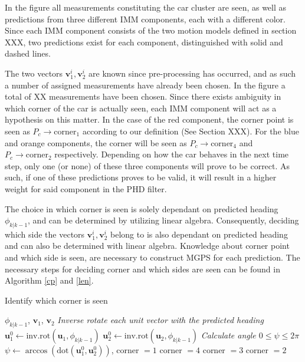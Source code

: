 In the figure all measurements constituting the car cluster are seen, as well as predictions from three different IMM components, each with a different color. Since each IMM component consists of the two motion models defined in section XXX, two predictions exist for each component, distinguished with solid and dashed lines. 

The two vectors $\mathbf{v}_{1}^i, \mathbf{v}_{2}^i$ are known since pre-processing has occurred, and as such a number of assigned measurements have already been chosen. In the figure a total of XX measurements have been chosen. Since there exists ambiguity in which corner of the car is actually seen, each IMM component will act as a hypothesis on this matter. In the case of the red component, the corner point is seen as $P_c \rightarrow \text{corner}_1$ according to our definition (See Section XXX). For the blue and orange components, the corner will be seen as $P_c \rightarrow \text{corner}_4$ and $P_c \rightarrow \text{corner}_2$ respectively. Depending on how the car behaves in the next time step, only one (or none) of these three components will prove to be correct. As such, if one of these predictions proves to be valid, it will result in a higher weight for said component in the PHD filter.

The choice in which corner is seen is solely dependant on predicted heading $\phi_{k|k-1}$, and can be determined by utilizing linear algebra. Consequently, deciding which side the vectors $\mathbf{v}_{1}^i, \mathbf{v}_{2}^i$ belong to is also dependant on predicted heading and can also be determined with linear algebra. Knowledge about corner point and which side is seen, are necessary to construct MGPS for each prediction. The necessary steps for deciding corner and which sides are seen can be found in Algorithm \ref{cp} and \ref{len}.


\begin{algorithm}[H]
\caption{Identify which corner is seen}\label{cp}
\begin{algorithmic}
\Input $\phi_{k|k-1}$, $\mathbf{v}_1$, $\mathbf{v}_2$
\State \textit{Inverse rotate each unit vector with the predicted heading}
\State $\mathbf{u}_1^{0}  \leftarrow \text{inv.rot}(\mathbf{u}_1, \phi_{k|k-1})$
\State $\mathbf{u}_2^{0}  \leftarrow \text{inv.rot}(\mathbf{u}_2, \phi_{k|k-1})$
\State \textit{Calculate angle $0 \leq \psi \leq 2\pi$}
\State $\psi \leftarrow \arccos(\text{dot}(\mathbf{u}_1^{0},\mathbf{u}_2^{0}))$, 
\State corner $= 1$
\State corner $= 4$
\State corner $= 3$
\State corner $= 2$
\EndIf
{}
\end{algorithmic}
\end{algorithm}

